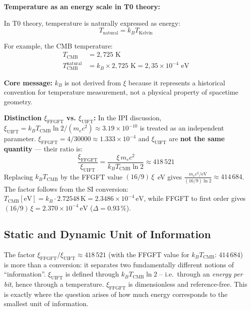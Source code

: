 	\begin{insight}
		\textbf{Temperature as an energy scale in T0 theory:}
		
		In T0 theory, temperature is naturally expressed as energy:
		\begin{equation}
			T_{\text{natural}} = k_B T_{\text{Kelvin}}
		\end{equation}
		
		For example, the CMB temperature:
		\begin{align}
			T_{\text{CMB}} &= 2{,}725 \text{ K} \\
			T_{\text{CMB}}^{\text{natural}} &= k_B \times 2{,}725 \text{ K} = 2{,}35 \times 10^{-4} \text{ eV}
		\end{align}
		
		\textbf{Core message:} $k_B$ is not derived from $\xi$ because it represents a historical convention for temperature measurement, not a physical property of spacetime geometry.

		\textbf{Distinction $\xi_{\text{FFGFT}}$ vs. $\xi_{\text{UIFT}}$:}
		In the IPI discussion, $\xi_{\text{UIFT}} = k_B T_{\text{CMB}} \ln 2 / (m_e c^2) \approx 3.19 \times 10^{-10}$ is treated as an independent parameter.
		$\xi_{\text{FFGFT}} = 4/30000 \approx 1.333 \times 10^{-4}$ and $\xi_{\text{UIFT}}$ are \textbf{not the same quantity} — their ratio is:
		\begin{equation}
			\frac{\xi_{\text{FFGFT}}}{\xi_{\text{UIFT}}} = \frac{\xi\, m_e c^2}{k_B T_{\text{CMB}} \ln 2} \approx 418\,521
		\end{equation}
		Replacing $k_B T_{\text{CMB}}$ by the FFGFT value $(16/9)\,\xi$~eV gives $\frac{m_e c^2/\text{eV}}{(16/9)\ln 2} \approx 414\,684$.
		The factor follows from the SI conversion: $T_{\text{CMB}}[\text{eV}] = k_B \cdot 2.72548\,\text{K} = 2.3486 \times 10^{-4}\,\text{eV}$, while FFGFT to first order gives $(16/9)\,\xi = 2.370 \times 10^{-4}\,\text{eV}$ ($\Delta = 0.93\,\%$).
	\end{insight}

	\subsection{Static and Dynamic Unit of Information}

	The factor $\xi_{\text{FFGFT}}/\xi_{\text{UIFT}} \approx 418\,521$ (with the FFGFT value for $k_B T_{\text{CMB}}$: $414\,684$) is more than a
	conversion: it separates two fundamentally different notions of ``information''.
	$\xi_{\text{UIFT}}$ is defined through $k_B T_{\text{CMB}} \ln 2$ -- i.e.\ through
	an \emph{energy per bit}, hence through a temperature. $\xi_{\text{FFGFT}}$ is
	dimensionless and reference-free. This is exactly where the question arises of how
	much energy corresponds to the smallest unit of information.

